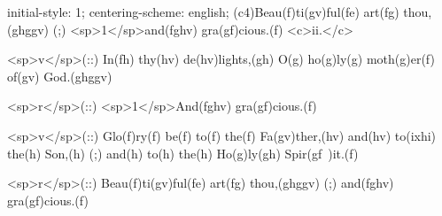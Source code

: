 initial-style: 1;
centering-scheme: english;
(c4)Beau(f)ti(gv)ful(fe) art(fg) thou,(ghggv) (;) <sp>1</sp>and(fghv) gra(gf)cious.(f) <c>ii.</c>

<sp>v</sp>(::) In(fh) thy(hv) de(hv)lights,(gh) O(g) ho(g)ly(g) moth(g)er(f) of(gv) God.(ghggv)

<sp>r</sp>(::) <sp>1</sp>And(fghv) gra(gf)cious.(f)

<sp>v</sp>(::) Glo(f)ry(f) be(f) to(f) the(f) Fa(gv)ther,(hv) and(hv) to(ixhi) the(h) Son,(h) (;) and(h) to(h) the(h) Ho(g)ly(gh) Spir(gf~)it.(f)

<sp>r</sp>(::) Beau(f)ti(gv)ful(fe) art(fg) thou,(ghggv) (;) and(fghv) gra(gf)cious.(f)